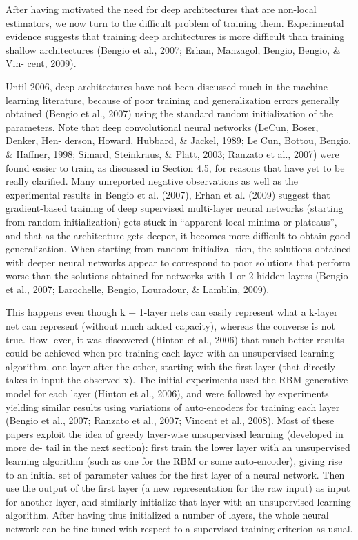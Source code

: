 \documentclass[cic,tc]{iiufrgs}
\begin{document}
After having motivated the need for deep architectures that are non-local
estimators, we now turn to the difficult problem of training them.
Experimental evidence suggests that training deep architectures is more
difficult than training shallow architectures (Bengio et al., 2007; Erhan,
Manzagol, Bengio, Bengio, \& Vin- cent, 2009).\cite{bengio2009learning}

Until 2006, deep architectures have not been discussed much in the machine
learning literature, because of poor training and generalization errors
generally obtained (Bengio et al., 2007) using the standard random
initialization of the parameters. Note that deep convolutional neural
networks (LeCun, Boser, Denker, Hen- derson, Howard, Hubbard, \& Jackel, 1989;
Le Cun, Bottou, Bengio, \& Haffner, 1998; Simard, Steinkraus, \& Platt, 2003;
Ranzato et al., 2007) were found easier to train, as discussed in Section
4.5, for reasons that have yet to be really clarified.  Many unreported
negative observations as well as the experimental results in Bengio et al.
(2007), Erhan et al. (2009) suggest that gradient-based training of deep
supervised multi-layer neural networks (starting from random initialization)
gets stuck in “apparent local minima or plateaus”, and that as the
architecture gets deeper, it becomes more difficult to obtain good
generalization. When starting from random initializa- tion, the solutions
obtained with deeper neural networks appear to correspond to poor solutions
that perform worse than the solutions obtained for networks with 1 or 2
hidden layers (Bengio et al., 2007; Larochelle, Bengio, Louradour, \& Lamblin,
2009).\cite{bengio2009learning}

This happens even though k + 1-layer nets can easily represent what a k-layer
net can represent (without much added capacity), whereas the converse is not
true. How- ever, it was discovered (Hinton et al., 2006) that much better
results could be achieved when pre-training each layer with an unsupervised
learning algorithm, one layer after the other, starting with the first layer
(that directly takes in input the observed x). The initial experiments used
the RBM generative model for each layer (Hinton et al., 2006), and were
followed by experiments yielding similar results using variations of
auto-encoders for training each layer (Bengio et al., 2007; Ranzato et al.,
2007; Vincent et al., 2008).  Most of these papers exploit the idea of greedy
layer-wise unsupervised learning (developed in more de- tail in the next
section): first train the lower layer with an unsupervised learning algorithm
(such as one for the RBM or some auto-encoder), giving rise to an initial set
of parameter values for the first layer of a neural network. Then use the
output of the first layer (a new representation for the raw input) as input
for another layer, and similarly initialize that layer with an unsupervised
learning algorithm. After having thus initialized a number of layers, the
whole neural network can be fine-tuned with respect to a supervised training
criterion as usual.\cite{bengio2009learning}
\end{document}
